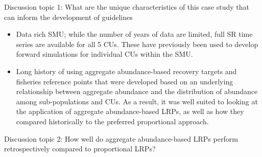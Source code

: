\documentclass[11pt]{book}
\begin{document}
Discussion topic 1: What are the unique characteristics of this case study that can inform the development of guidelines
\begin{itemize}

\item
  Data rich SMU; while the number of years of data are limited, full SR time series are available for all 5 CUs. These have previously been used to develop forward simulations for individual CUs within the SMU.
\item
  Long history of using aggregate abundance-based recovery targets and fisheries reference points that were developed based on an underlying relationship between aggregate abundance and the distribution of abundance among sub-populations and CUs. As a result, it was well suited to looking at the application of aggregate abundance-based LRPs, as well as how they compared historically to the preferred proportional approach.
\end{itemize}
Discussion topic 2: How well do aggregate abundance-based LRPs perform retrospectively compared to proportional LRPs?
\end{document}
